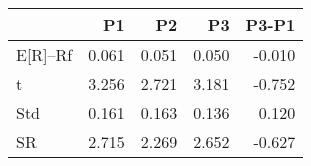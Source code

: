 \begin{tabular}{lrrrr}
\toprule
 & P1 & P2 & P3 & P3-P1 \\
\midrule
E[R]--Rf & 0.061 & 0.051 & 0.050 & -0.010 \\
t & 3.256 & 2.721 & 3.181 & -0.752 \\
Std & 0.161 & 0.163 & 0.136 & 0.120 \\
SR & 2.715 & 2.269 & 2.652 & -0.627 \\
\bottomrule
\end{tabular}
